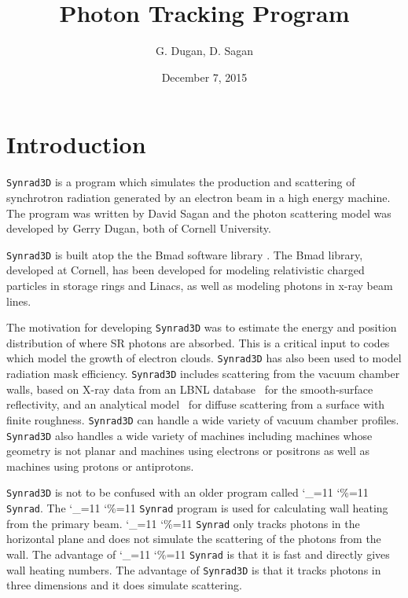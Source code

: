 \documentclass[11pt,openany]{report}
\title{ \srthree Photon Tracking Program}
\author{G. Dugan, D. Sagan}
\date{December 7, 2015}
\newcommand{\srthree}{\texttt{Synrad3D}\xspace}
\newcommand\ttcmd{\begingroup\catcode`\_=11 \catcode`\%=11 \dottcmd}
\newcommand\dottcmd[1]{\texttt{#1}\endgroup}
\newcommand{\vn}{\ttcmd}
\begin{document}
\maketitle

\tableofcontents

\chapter{Introduction} 
\label{s:intro}

\srthree is a program which simulates the production and scattering of
synchrotron radiation generated by an electron beam in a high energy
machine. The program was written by David Sagan and the photon
scattering model was developed by Gerry Dugan, both of Cornell
University.

\srthree is built atop the the Bmad software library
\cite{b:bmad}. The Bmad library, developed at Cornell, has been
developed for modeling relativistic charged particles in storage rings
and Linacs, as well as modeling photons in x-ray beam lines.

The motivation for developing \srthree was to estimate the energy and
position distribution of where SR photons are absorbed. This is a
critical input to codes which model the growth of electron clouds.
\srthree has also been used to model radiation mask efficiency.
\srthree includes scattering from the vacuum chamber walls, based on
X-ray data from an LBNL database~\cite{b:henke} for the smooth-surface
reflectivity, and an analytical model~\cite{b:beckmann,b:ogilvy} for
diffuse scattering from a surface with finite roughness. \srthree can
handle a wide variety of vacuum chamber profiles. \srthree also
handles a wide variety of machines including machines whose geometry
is not planar and machines using electrons or positrons as well as
machines using protons or antiprotons.

\srthree is not to be confused with an older program called
\vn{Synrad}. The \vn{Synrad} program is used for calculating wall
heating from the primary beam. \vn{Synrad} only tracks photons in the
horizontal plane and does not simulate the scattering of the photons
from the wall. The advantage of \vn{Synrad} is that it is fast and
directly gives wall heating numbers. The advantage of \srthree is that
it tracks photons in three dimensions and it does simulate scattering.

\end{document}
